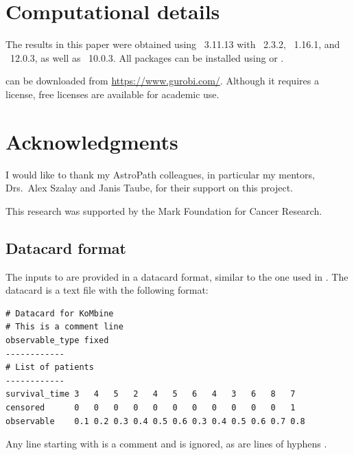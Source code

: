 \documentclass[article]{jss}
\begin{document}
\section*{Computational details}

The results in this paper were obtained using ~3.11.13 with ~2.3.2, ~1.16.1, and ~12.0.3, as well as ~10.0.3.  All  packages can be installed using  or .

 can be downloaded from \url{https://www.gurobi.com/}.  Although it requires a license, free licenses are available for academic use.

\section*{Acknowledgments}

I would like to thank my AstroPath colleagues, in particular my mentors, Drs.~Alex Szalay and Janis Taube, for their support on this project.

This research was supported by the Mark Foundation for Cancer Research.






\newpage

\begin{appendix}

\section{Datacard format}\label{app:datacard}

The inputs to  are provided in a datacard format, similar to the one used in  \citep{CAT-23-001}.  The datacard is a text file with the following format:
\begin{verbatim}
# Datacard for KoMbine
# This is a comment line
observable_type fixed
------------
# List of patients
------------
survival_time 3   4   5   2   4   5   6   4   3   6   8   7
censored      0   0   0   0   0   0   0   0   0   0   0   1
observable    0.1 0.2 0.3 0.4 0.5 0.6 0.3 0.4 0.5 0.6 0.7 0.8
\end{verbatim}
\end{appendix}
Any line starting with \code{\#} is a comment and is ignored, as are lines of hyphens \code{------------}.
\end{document}
